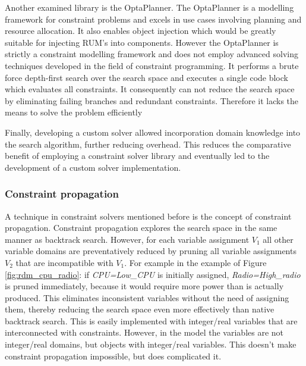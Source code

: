 Another examined library is the OptaPlanner\cite{web:opta}. The OptaPlanner is a modelling framework for constraint problems and excels in use cases involving planning and resource allocation. It also enables object injection which would be greatly suitable for injecting RUM's into components. However the OptaPlanner is strictly a constraint modelling framework and does not employ advanced solving techniques developed in the field of constraint programming. It performs a brute force depth-first search over the search space and executes a single code block which evaluates all constraints. It consequently can not reduce the search space by eliminating failing branches and redundant constraints. Therefore it lacks the means to solve the problem efficiently

Finally, developing a custom solver allowed incorporation domain knowledge into the search algorithm, further reducing overhead. This reduces the comparative benefit of employing a constraint solver library and eventually led to the development of a custom solver implementation.

\subsubsection{Constraint propagation}
A technique in constraint solvers mentioned before is the concept of constraint propagation\cite{ref-zoeken}. Constraint propagation explores the search space in the same manner as backtrack search. However, for each variable assignment $V_1$ all other variable domains are preventatively reduced by pruning all variable assignments $V_2$ that are incompatible with $V_1$. For example in the example of Figure \ref{fig:rdm_cpu_radio}: if \emph{CPU=Low\_CPU} is initially assigned, \emph{Radio=High\_radio} is pruned immediately, because it would require more power than is actually produced. This eliminates inconsistent variables without the need of assigning them, thereby reducing the search space even more effectively than native backtrack search. This is easily implemented with integer/real variables that are interconnected with constraints. However, in the model the variables are not integer/real domains, but objects with integer/real variables. This doesn't make constraint propagation impossible, but does complicated it.

